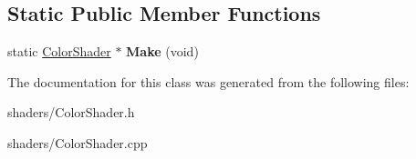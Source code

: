 \subsection*{\-Static \-Public \-Member \-Functions}
\begin{DoxyCompactItemize}
\item 
\hypertarget{classColorShader_a12a041a319bf5bb912074a10ab251d50}{static \hyperlink{classColorShader}{\-Color\-Shader} $\ast$ {\bfseries \-Make} (void)}\label{classColorShader_a12a041a319bf5bb912074a10ab251d50}

\end{DoxyCompactItemize}


\-The documentation for this class was generated from the following files\-:\begin{DoxyCompactItemize}
\item 
shaders/\-Color\-Shader.\-h\item 
shaders/\-Color\-Shader.\-cpp\end{DoxyCompactItemize}
